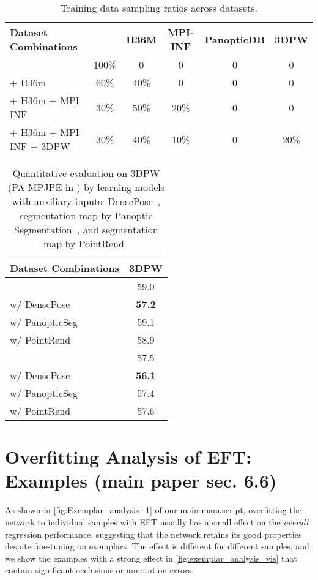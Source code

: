 \documentclass[10pt,twocolumn,letterpaper]{article}
\begin{document}
	


	\begin{table*}[t]
		\centering
\begin{tabular}{lccccc}
			\toprule
			\textbf{Dataset Combinations} &  & \textbf{H36M} & \textbf{MPI-INF} & \textbf{PanopticDB}  & \textbf{3DPW}  \\
			\midrule
			    & 100\% &  0 & 0 & 0  & 0\\
			 + H36m & 60\% &  40\% & 0 & 0  & 0\\
 + H36m + MPI-INF   & 30\% &  50\% & 20\% & 0  & 0 \\
			 + H36m + MPI-INF + 3DPW & 30\% &  40\% & 10\% & 0  & 20\% \\
			\bottomrule
		\end{tabular}
		\caption{
			Training data sampling ratios across datasets. 
			\label{table:dataset-ratio}}
	\end{table*}
	
	\begin{table}[t]
		\centering
\begin{tabular}{l|c}
			\toprule
			\textbf{Dataset Combinations} & \textbf{3DPW}  \\
			\midrule
			 &  59.0\\
			 w/ DensePose   & \textbf{57.2}  \\
			 w/ PanopticSeg    & 59.1  \\
			 w/ PointRend  & 58.9  \\
			\midrule
			 &  57.5 \\
			 w/ DensePose  & \textbf{56.1} \\
			 w/ PanopticSeg  & 57.4  \\
			 w/ PointRend  & 57.6  \\
			\bottomrule
		\end{tabular}
		\caption{
			Quantitative evaluation on 3DPW (PA-MPJPE in ) by learning models with auxiliary inputs: DensePose~\cite{guler2018densepose}, segmentation map by Panoptic Segmentation~\cite{kirillov2019panoptic}, and segmentation map by PointRend~\cite{kirillov2020pointrend}
			\label{table:quant-auxiliary-input}}
	\end{table}
	
	\section{Overfitting Analysis of EFT: Examples (main paper sec. 6.6)}
	As shown in \cref{fig:Exemplar_analysis_1} of our main manuscript, overfitting the network to individual samples with EFT usually has a small effect on the \emph{overall} regression performance, suggesting that the network retains its good properties despite fine-tuning on exemplars. 
	The effect is different for different samples, and we show the examples with a strong effect in \cref{fig:exemplar_analysis_vis} that contain significant occlusions or annotation errors.
	
\end{document}
